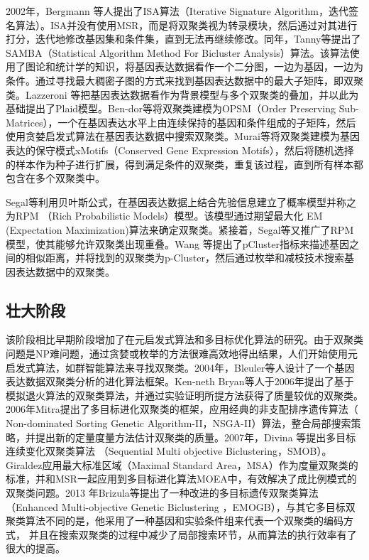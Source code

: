     2002年，Bergmann 等人提出了ISA算法（Iterative Signature Algorithm，迭代签名算法）。ISA并没有使用MSR，而是将双聚类视为转录模块，然后通过对其进行打分，迭代地修改基因集和条件集，直到无法再继续修改。同年，Tanny等提出了SAMBA（Statistical Algorithm Method For Bicluster Analysis）算法。该算法使用了图论和统计学的知识，将基因表达数据看作一个二分图，一边为基因，一边为条件。通过寻找最大稠密子图的方式来找到基因表达数据中的最大子矩阵，即双聚类。Lazzeroni 等把基因表达数据看作为背景模型与多个双聚类的叠加，并以此为基础提出了Plaid模型。Ben-dor等将双聚类建模为OPSM（Order Preserving Sub-Matrices），一个在基因表达水平上由连续保持的基因和条件组成的子矩阵，然后使用贪婪启发式算法在基因表达数据中搜索双聚类。Murai等将双聚类建模为基因表达的保守模式xMotifs（Conserved Gene Expression Motifs），然后将随机选择的样本作为种子进行扩展，得到满足条件的双聚类，重复该过程，直到所有样本都包含在多个双聚类中。

    Segal等利用贝叶斯公式，在基因表达数据上结合先验信息建立了概率模型并称之为RPM （Rich Probabilistic Models）模型。该模型通过期望最大化 EM (Expectation Maximization)算法来确定双聚类。紧接着，Segal等又推广了RPM模型，使其能够允许双聚类出现重叠。Wang 等提出了pCluster指标来描述基因之间的相似距离，并将找到的双聚类为p-Cluster，然后通过枚举和减枝技术搜索基因表达数据中的双聚类。

    \subsection{壮大阶段}
    该阶段相比早期阶段增加了在元启发式算法和多目标优化算法的研究。由于双聚类问题是NP难问题，通过贪婪或枚举的方法很难高效地得出结果，人们开始使用元启发式算法，如群智能算法来寻找双聚类。2004年，Bleuler等人设计了一个基因表达数据双聚类分析的进化算法框架。Ken-neth Bryan等人于2006年提出了基于模拟退火算法的双聚类算法，并通过实验证明所提方法获得了质量较优的双聚类。2006年Mitra提出了多目标进化双聚类的框架，应用经典的非支配排序遗传算法（ Non-dominated Sorting Genetic Algorithm-II，NSGA-II）算法，整合局部搜索策略，并提出新的定量度量方法估计双聚类的质量。2007年，Divina 等提出多目标连续变化双聚类算法 （Sequential Multi objective Biclustering，SMOB）。Giraldez应用最大标准区域（Maximal Standard Area，MSA）作为度量双聚类的标准，并和MSR一起应用到多目标进化算法MOEA中，有效解决了成比例模式的双聚类问题。2013 年Brizula等提出了一种改进的多目标遗传双聚类算法（Enhanced Multi-objective Genetic Biclustering ，EMOGB），与其它多目标双聚类算法不同的是，他采用了一种基因和实验条件组来代表一个双聚类的编码方式， 并且在搜索双聚类的过程中减少了局部搜索环节，从而算法的执行效率有了很大的提高。
    
